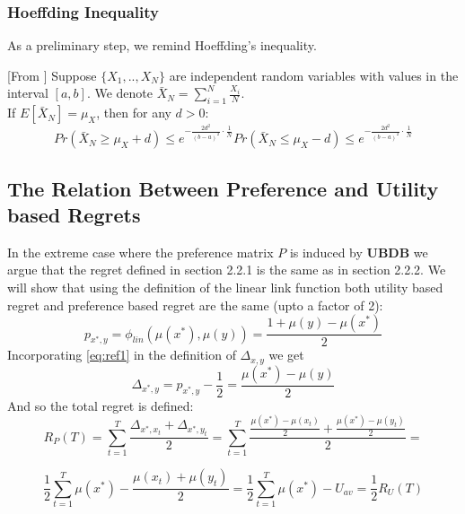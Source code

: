 \documentclass{llncs}
\begin{document}
	\subsubsection{Hoeffding Inequality}	
	As a preliminary step, we remind Hoeffding’s inequality.
	\begin{theorem}\label{thm:Hoeffding}[From \cite{...}]
	Suppose $\{X_1,..,X_N \}$ are independent random variables with values in the interval $[a,b]$.
	We denote $\bar{X}_N = \sum_{i=1}^N \frac{X_i}{N}$.\\
	If $E[\bar{X}_N] = \mu_X$, then for any $d>0$:
	\begin{subequations}
	\begin{equation}
	Pr(\bar{X}_N \geq \mu_X+ d) \leq e^{-\frac{2d^2}{(b-a)^2}\cdot\frac{1}{N}}
	\end{equation}
	\begin{equation}
	Pr(\bar{X}_N \leq \mu_X- d) \leq e^{-\frac{2d^2}{(b-a)^2}\cdot\frac{1}{N}}
	\end{equation}
	\end{subequations}
	\end{theorem}
	\subsection{The Relation Between Preference and Utility based Regrets}
	
	In the extreme case where the preference matrix $P$ is induced by \textbf{UBDB} we argue that the regret defined in  section 2.2.1 is the same as in  section 2.2.2. 
	We will show that using the definition of the linear link function both utility based regret and preference based regret are the same (upto a factor of 2): 
	\begin{equation}\label{eq:ref1}
		p_{x^*,y} = \phi_{lin}(\mu(x^*),\mu(y)) = \frac{1 +\mu(y)-\mu(x^*)}{2}
	\end{equation}
	Incorporating \eqref{eq:ref1} in the definition of $\Delta_{x,y}$ we get
	$$
	\Delta_{x^*,y} = p_{x^*,y} - \frac{1}{2} = \frac{\mu(x^*)-\mu(y)}{2}
	$$
	And so the total regret is defined:
	\
	$$ R_P(T) = \sum_{t=1}^T \frac{\Delta_{x^*,x_t}+\Delta_{x^*,y_t}}{2} =  
\sum_{t=1}^T \frac{\frac{\mu(x^*)-\mu(x_t)}{2}+\frac{\mu(x^*)-\mu(y_t)}{2}}{2} =
$$

$$
\frac{1}{2} \sum_{t=1}^T \mu(x^*) -\frac{
	\mu(x_t)+\mu(y_t)}{2} =
\frac{1}{2} \sum_{t=1}^T \mu(x^*)- U_{av} = \frac{1}{2}R_U(T)$$
\end{document}
